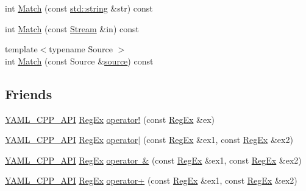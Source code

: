 \begin{DoxyCompactItemize}
\item 
int \mbox{\hyperlink{class_y_a_m_l_1_1_reg_ex_aec5a2989ce40d29a7ff9041943a957cf}{Match}} (const \mbox{\hyperlink{glad_8h_ac83513893df92266f79a515488701770}{std\+::string}} \&str) const
\item 
int \mbox{\hyperlink{class_y_a_m_l_1_1_reg_ex_abaaa5a06ab887c7d345499ff5668606e}{Match}} (const \mbox{\hyperlink{class_y_a_m_l_1_1_stream}{Stream}} \&in) const
\item 
{\footnotesize template$<$typename Source $>$ }\\int \mbox{\hyperlink{class_y_a_m_l_1_1_reg_ex_af6156571d13866b07908e2e6d611cc10}{Match}} (const Source \&\mbox{\hyperlink{glad_8h_a6ffd2192cbc75d017665e95207ee36a7}{source}}) const
\end{DoxyCompactItemize}
\subsection*{Friends}
\begin{DoxyCompactItemize}
\item 
\mbox{\hyperlink{dll_8h_a70903db05b58f40db9aa4f966658fa65}{Y\+A\+M\+L\+\_\+\+C\+P\+P\+\_\+\+A\+PI}} \mbox{\hyperlink{class_y_a_m_l_1_1_reg_ex}{Reg\+Ex}} \mbox{\hyperlink{class_y_a_m_l_1_1_reg_ex_a843a6e2a6c42795ca1282848f5594dbe}{operator!}} (const \mbox{\hyperlink{class_y_a_m_l_1_1_reg_ex}{Reg\+Ex}} \&ex)
\item 
\mbox{\hyperlink{dll_8h_a70903db05b58f40db9aa4f966658fa65}{Y\+A\+M\+L\+\_\+\+C\+P\+P\+\_\+\+A\+PI}} \mbox{\hyperlink{class_y_a_m_l_1_1_reg_ex}{Reg\+Ex}} \mbox{\hyperlink{class_y_a_m_l_1_1_reg_ex_a87db818e0bd5370f811f3fc3ba1ddbc5}{operator$\vert$}} (const \mbox{\hyperlink{class_y_a_m_l_1_1_reg_ex}{Reg\+Ex}} \&ex1, const \mbox{\hyperlink{class_y_a_m_l_1_1_reg_ex}{Reg\+Ex}} \&ex2)
\item 
\mbox{\hyperlink{dll_8h_a70903db05b58f40db9aa4f966658fa65}{Y\+A\+M\+L\+\_\+\+C\+P\+P\+\_\+\+A\+PI}} \mbox{\hyperlink{class_y_a_m_l_1_1_reg_ex}{Reg\+Ex}} \mbox{\hyperlink{class_y_a_m_l_1_1_reg_ex_a8bea108f9b6252aa9fe7f7f6536511b5}{operator \&}} (const \mbox{\hyperlink{class_y_a_m_l_1_1_reg_ex}{Reg\+Ex}} \&ex1, const \mbox{\hyperlink{class_y_a_m_l_1_1_reg_ex}{Reg\+Ex}} \&ex2)
\item 
\mbox{\hyperlink{dll_8h_a70903db05b58f40db9aa4f966658fa65}{Y\+A\+M\+L\+\_\+\+C\+P\+P\+\_\+\+A\+PI}} \mbox{\hyperlink{class_y_a_m_l_1_1_reg_ex}{Reg\+Ex}} \mbox{\hyperlink{class_y_a_m_l_1_1_reg_ex_abcfae427f23bbd217379d1ab283e4fef}{operator+}} (const \mbox{\hyperlink{class_y_a_m_l_1_1_reg_ex}{Reg\+Ex}} \&ex1, const \mbox{\hyperlink{class_y_a_m_l_1_1_reg_ex}{Reg\+Ex}} \&ex2)
\end{DoxyCompactItemize}


